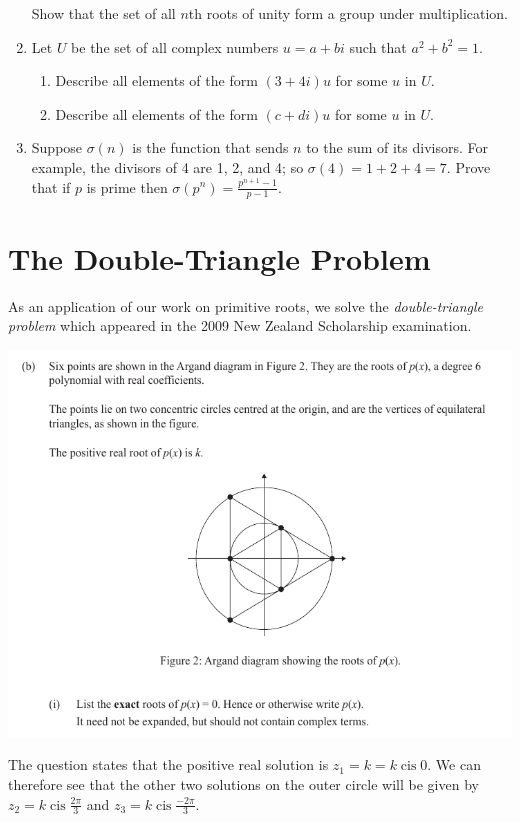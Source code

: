 \documentclass[a4paper,10pt,titlepage]{article}
\theoremstyle{definition}
\DeclareMathOperator{\cis}{cis}
\begin{document}
\begin{enumerate}
\begin{enumerate}
        \end{enumerate}
       Show that the set of all $ n$th roots of unity form a group under multiplication.
  \item Let $ U $ be the set of all complex numbers $ u = a + bi $ such that $ a^2 + b^2 = 1 $.
        \begin{enumerate}
          \item Describe all elements of the form $ (3 + 4i)u $ for some $ u $ in $ U $.
          \item Describe all elements of the form $ (c + di)u $ for some $ u $ in $ U $.
        \end{enumerate}
  \item Suppose $ \sigma(n) $ is the function that sends $ n $ to the sum of its divisors. For example,
        the divisors of 4 are 1, 2, and 4; so $ \sigma(4) = 1 + 2 + 4 = 7 $. Prove that if $ p $ is
        prime then $ \sigma(p^n) = \frac{p^{n+1} - 1}{p - 1} $.
\end{enumerate}

\section{The Double-Triangle Problem}\label{sec:triangle}
As an application of our work on primitive roots, we solve the \emph{double-triangle problem} which appeared
in the 2009 New Zealand Scholarship examination.

\includegraphics[width=\textwidth]{double_triangle}

The question states that the positive real solution is $ z_1 = k = k \cis 0 $. We
can therefore see that the other two solutions on the outer circle will be given
by $ z_2 = k \cis \frac{2\pi}{3} $ and $ z_3 = k \cis \frac{-2\pi}{3} $.
\end{document}
